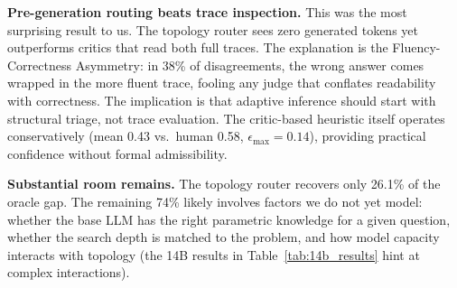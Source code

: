 \documentclass[11pt]{article}
\begin{document}
\textbf{Pre-generation routing beats trace inspection.}
This was the most surprising result to us. The topology router sees zero generated tokens yet outperforms critics that read both full traces. The explanation is the Fluency-Correctness Asymmetry: in 38\% of disagreements, the wrong answer comes wrapped in the more fluent trace, fooling any judge that conflates readability with correctness. The implication is that adaptive inference should start with structural triage, not trace evaluation. The critic-based heuristic itself operates conservatively (mean 0.43 vs.\ human 0.58, $\epsilon_{\max}=0.14$), providing practical confidence without formal admissibility.

\textbf{Substantial room remains.}
The topology router recovers only 26.1\% of the oracle gap. The remaining 74\% likely involves factors we do not yet model: whether the base LLM has the right parametric knowledge for a given question, whether the search depth is matched to the problem, and how model capacity interacts with topology (the 14B results in Table~\ref{tab:14b_results} hint at complex interactions).
\end{document}
